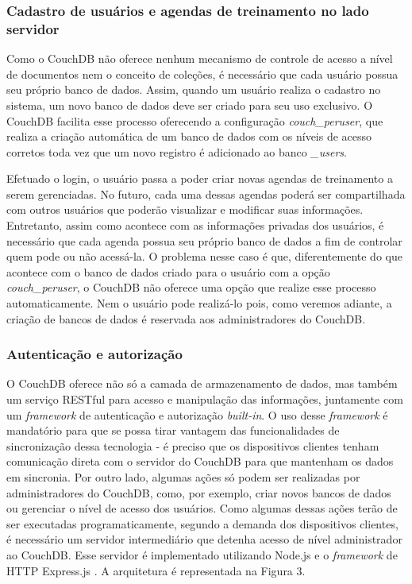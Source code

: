 \documentclass[
	article,			%
	11pt,				%
	oneside,			%
	a4paper,			%
	english,			%
	brazil,				%
	sumario=tradicional
	]{abntex2}
\begin{document}
\subsubsection{Cadastro de usuários e agendas de treinamento no lado servidor}

Como o CouchDB não oferece nenhum mecanismo de controle de acesso a nível de documentos nem o conceito de coleções, é necessário que cada usuário possua seu próprio banco de dados. Assim, quando um usuário realiza o cadastro no sistema, um novo banco de dados deve ser criado para seu uso exclusivo. O CouchDB facilita esse processo oferecendo a configuração \textit{couch\_peruser}, que realiza a criação automática de um banco de dados com os níveis de acesso corretos toda vez que um novo registro é adicionado ao banco \textit{\_users}.

Efetuado o login, o usuário passa a poder criar novas agendas de treinamento a serem gerenciadas. No futuro, cada uma dessas agendas poderá ser compartilhada com outros usuários que poderão visualizar e modificar suas informações. Entretanto, assim como acontece com as informações privadas dos usuários, é necessário que cada agenda possua seu próprio banco de dados a fim de controlar quem pode ou não acessá-la. O problema nesse caso é que, diferentemente do que acontece com o banco de dados criado para o usuário com a opção \textit{couch\_peruser}, o CouchDB não oferece uma opção que realize esse processo automaticamente. Nem o usuário pode realizá-lo pois, como veremos adiante, a criação de bancos de dados é reservada aos administradores do CouchDB.

\subsubsection{Autenticação e autorização}

O CouchDB oferece não só a camada de armazenamento de dados, mas também um serviço RESTful para acesso e manipulação das informações, juntamente com um \textit{framework} de autenticação e autorização \textit{built-in}. O uso desse \textit{framework} é mandatório para que se possa tirar vantagem das funcionalidades de sincronização dessa tecnologia - é preciso que os dispositivos clientes tenham comunicação direta com o servidor  do CouchDB para que mantenham os dados em sincronia. Por outro lado, algumas ações só podem ser realizadas por administradores do CouchDB, como, por exemplo, criar novos bancos de dados ou gerenciar o nível de acesso dos usuários. Como algumas dessas ações terão de ser executadas programaticamente, segundo a demanda dos dispositivos clientes, é necessário um servidor intermediário que detenha acesso de nível administrador ao CouchDB. Esse servidor é implementado utilizando Node.js \cite{node-2017} e o \textit{framework} de HTTP Express.js \cite{express-2017}. A arquitetura é representada na Figura 3.
\end{document}
